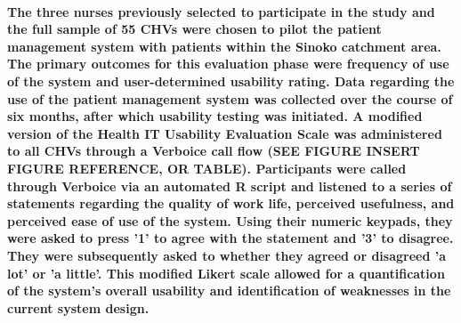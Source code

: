 \paragraph{The three nurses previously selected to participate in the study and the full sample of 55 CHVs were chosen to pilot the patient management system with patients within the Sinoko catchment area. The primary outcomes for this evaluation phase were frequency of use of the system and user-determined usability rating. Data regarding the use of the patient management system was collected over the course of six months, after which usability testing was initiated. A modified version of the Health IT Usability Evaluation Scale \citep{Yen2010} was administered to all CHVs through a Verboice call flow (SEE FIGURE INSERT FIGURE REFERENCE, OR TABLE). Participants were called through Verboice via an automated R script and listened to a series of statements regarding the quality of work life, perceived usefulness, and perceived ease of use of the system. Using their numeric keypads, they were asked to press '1' to agree with the statement and '3' to disagree. They were subsequently asked to whether they agreed or disagreed 'a lot' or 'a little'. This modified Likert scale allowed for a quantification of the system's overall usability and identification of weaknesses in the current system design.}


